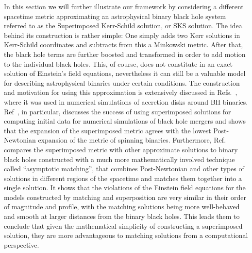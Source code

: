 In this section we will further illustrate our framework by considering a different spacetime metric approximating an astrophysical binary black hole system referred to as the Superimposed Kerr-Schild solution, or SKS solution. The idea behind its construction is rather simple: One simply adds two Kerr solutions in Kerr-Schild coordinates and subtracts from this a Minkowski metric. After that, the black hole terms are further boosted and transformed in order to add motion to the individual black holes. This, of course, does not constitute in an exact solution of Einstein's field equations, nevertheless it can still be a valuable model for describing astrophysical binaries under certain conditions. The construction and motivation for using this approximation is extensively discussed in Refs.~\cite{Armengol:2021shd, PhysRevD.104.044041}, where it was  used in numerical simulations of accretion disks around BH binaries. Ref~\cite{Armengol:2021shd}, in particular, discusses the success of using superimposed solutions for computing initial data for numerical simulations of black hole mergers and shows that the expansion of the superimposed metric agrees with the lowest Post-Newtonian expansion of the metric of spinning binaries. Furthermore, Ref.~\cite{PhysRevD.104.044041} compares the superimposed metric with other approximate solutions to binary black holes constructed with a much more mathematically involved technique called ``asymptotic matching'', that combines Post-Newtonian and other types of solutions in different regions of the spacetime and matches them together into a single solution. It shows that the violations of the Einstein field equations for the models constructed by matching and superposition are very similar in their order of magnitude and profile, with the matching solutions being more well-behaved and smooth at larger distances from the binary black holes. This leads them to conclude that given the mathematical simplicity of constructing a superimposed solution, they are more advantageous to matching solutions from a computational perspective.

